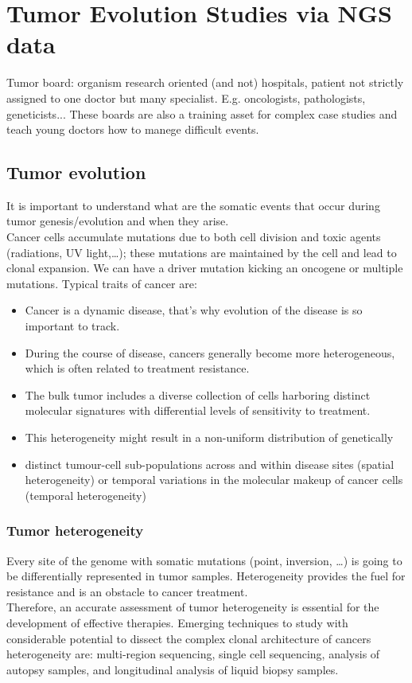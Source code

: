 \graphicspath{{chapters/04/}}

\chapter{Tumor Evolution Studies via NGS data}
Tumor board: organism research oriented (and not) hospitals, patient not strictly assigned to one doctor but many specialist. E.g. oncologists, pathologists, geneticists... These boards are also a training asset for complex case studies and teach young doctors how to manege difficult events.
\\
\section{Tumor evolution}
It is important to understand what are the somatic events that occur during tumor genesis/evolution and when they arise.\\
Cancer cells accumulate mutations due to both cell division and toxic agents (radiations, UV light,…); these mutations are maintained by the cell and lead to clonal expansion.  We can have a driver mutation kicking an oncogene or multiple mutations. 
Typical traits of cancer are:
\begin{itemize}
\item Cancer is a dynamic disease, that's why evolution of the disease is so important to track.
\item During the course of disease, cancers generally become more heterogeneous, which is often related to treatment resistance.
\item The bulk tumor includes a diverse collection of cells harboring distinct molecular signatures with differential levels of sensitivity to treatment.
\item This heterogeneity might result in a non-uniform distribution of genetically
\item distinct tumour-cell sub-populations across and within disease sites (spatial heterogeneity) or temporal variations in the molecular makeup of cancer cells (temporal heterogeneity)
\end{itemize}

\subsection{Tumor heterogeneity}
Every site of the genome with somatic mutations (point, inversion, …) is going to be differentially represented in tumor samples. Heterogeneity provides the fuel for resistance and is an obstacle to cancer treatment.
\\
Therefore, an accurate assessment of tumor heterogeneity is essential for the development of effective therapies. Emerging techniques to study with considerable potential to dissect the complex clonal architecture of cancers heterogeneity are: multi-region sequencing, single cell sequencing, analysis of autopsy samples, and longitudinal analysis of liquid biopsy samples.
\\
\\

